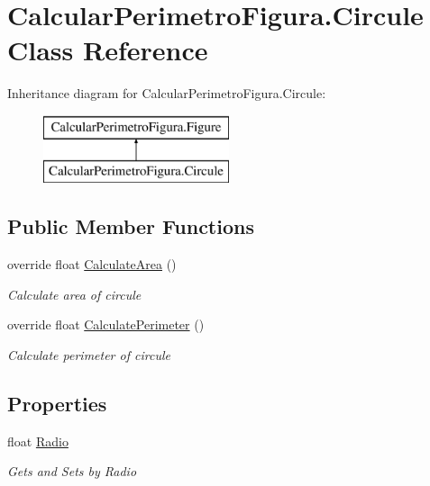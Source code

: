 \hypertarget{class_calcular_perimetro_figura_1_1_circule}{}\section{Calcular\+Perimetro\+Figura.\+Circule Class Reference}
\label{class_calcular_perimetro_figura_1_1_circule}
Inheritance diagram for Calcular\+Perimetro\+Figura.\+Circule\+:\begin{figure}[H]
\begin{center}
\leavevmode
\includegraphics[height=2.000000cm]{class_calcular_perimetro_figura_1_1_circule}
\end{center}
\end{figure}
\subsection*{Public Member Functions}
\begin{DoxyCompactItemize}
\item 
override float \hyperlink{class_calcular_perimetro_figura_1_1_circule_af188e09e228fff9da9d465c58adf3a32}{Calculate\+Area} ()
\begin{DoxyCompactList}\small\item\em Calculate area of circule \end{DoxyCompactList}\item 
override float \hyperlink{class_calcular_perimetro_figura_1_1_circule_aab97d89d50fbd9b1fd4e3e41b01a0f46}{Calculate\+Perimeter} ()
\begin{DoxyCompactList}\small\item\em Calculate perimeter of circule \end{DoxyCompactList}\end{DoxyCompactItemize}
\subsection*{Properties}
\begin{DoxyCompactItemize}
\item 
float \hyperlink{class_calcular_perimetro_figura_1_1_circule_ae57ba180a15d8f68fe180889966b57f8}{Radio}
\begin{DoxyCompactList}\small\item\em Gets and Sets by Radio \end{DoxyCompactList}\end{DoxyCompactItemize}


